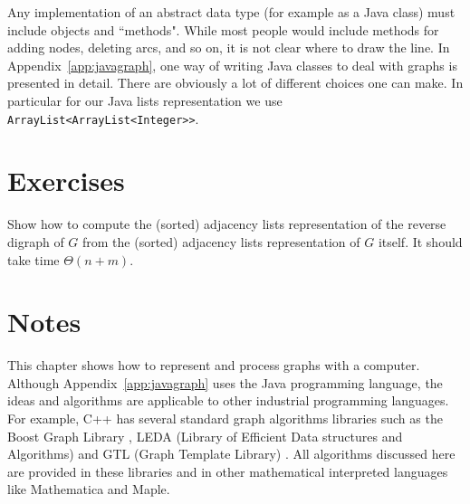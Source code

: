 Any implementation of an abstract data type (for example as a Java class)
must include objects and ``methods".  While most people would include
methods for adding nodes, deleting arcs, and so on, it is not clear where
to draw the line. In Appendix~\ref{app:javagraph}, one way of writing Java
classes to deal with graphs is presented in detail. There are obviously a
lot of different choices one can make. In particular 
for our Java lists representation we use 
\verb|ArrayList<ArrayList<Integer>>|. 

\section*{Exercises}

\begin{Exercise}\label{exr:compute-reverse}
Show how to compute the (sorted) adjacency lists representation of the 
reverse digraph of $G$ from the (sorted) adjacency lists representation of 
$G$ itself. It should take time $\Theta(n+m)$.
\end{Exercise}

\section{Notes}

This chapter shows how to represent and process graphs with a
computer. Although Appendix~\ref{app:javagraph} uses the Java
programming language, the ideas and algorithms are applicable to other
industrial programming languages.  For example,  C++  has
several standard graph algorithms libraries such as the Boost Graph
Library \cite{Boost}, LEDA (Library of
Efficient Data structures and Algorithms) \cite{mehlhorn} and GTL 
(Graph Template Library) \cite{brandenburg}. All algorithms discussed here 
are provided in these libraries and in other mathematical interpreted 
languages like Mathematica and Maple.
